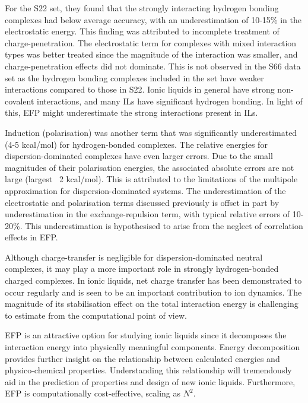 For the S22 set, they found that the strongly interacting hydrogen bonding complexes had below average accuracy, with an underestimation of 10-15\% in the electrostatic energy. 
\cite{Flick2012a}
This finding was attributed to incomplete treatment of charge-penetration.
The electrostatic term for complexes with mixed interaction types was better treated since the magnitude of the interaction was smaller, and charge-penetration effects did not dominate.
This is not observed in the S66 data set as the hydrogen bonding complexes included in the set have weaker interactions compared to those in S22.
Ionic liquids in general have strong non-covalent interactions, and many ILs have significant hydrogen bonding.
In light of this, EFP might underestimate the strong interactions present in ILs.


Induction (polarisation) was another term that was significantly underestimated (4-5 kcal/mol) for hydrogen-bonded complexes.
\cite{Flick2012a}
The relative energies for dispersion-dominated complexes have even larger errors. 
Due to the small magnitudes of their polarisation energies, the associated absolute errors are not large (largest ~2 kcal/mol).
This is attributed to the limitations of the multipole approximation for dispersion-dominated systems. 
The underestimation of the electrostatic and polarisation terms discussed previously is offset in part by underestimation in the exchange-repulsion term, with typical relative errors of 10-20\%. 
This underestimation is hypothesised to arise from the neglect of correlation effects in EFP.

Although charge-transfer is negligible for dispersion-dominated neutral complexes, it may play a more important role in strongly hydrogen-bonded charged complexes.
In ionic liquids, net charge transfer has been demonstrated to occur regularly and is seen to be an important contribution to ion dynamics. 
\cite{Izgorodina2011a} 
The magnitude of its stabilisation effect on the total interaction energy is challenging to estimate from the computational point of view.


EFP is an attractive option for studying ionic liquids since it decomposes the interaction energy into physically meaningful components.
Energy decomposition provides further insight on the relationship between calculated energies and physico-chemical properties.
\cite{Izgorodina2014a}
Understanding this relationship will tremendously aid in the prediction of properties and design of new ionic liquids.
Furthermore, EFP is computationally cost-effective, scaling as $N^2$.
\cite{Flick2012a}


